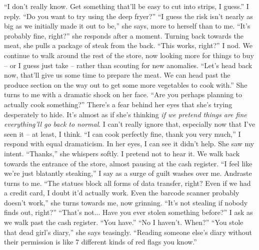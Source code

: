 \documentclass[a4paper, 12pt]{book}
\newcommand\tab[1][1cm]{\hspace*{#1}}
\begin{document}
\tab
``I don’t really know. Get something that’ll be easy to cut into strips, I guess.'' I reply. ``Do you want to try using the deep fryer?''
\newline
\tab
``I guess the risk isn’t nearly as big as we initially made it out to be,'' she says, more to herself than to me. ``It’s probably fine, right?'' she responds after a moment. Turning back towards the meat, she pulls a package of steak from the back. ``This works, right?'' I nod. We continue to walk around the rest of the store, now looking more for things to buy -- or I guess just take -- rather than scouting for new anomalies.
\newline
\tab
``Let’s head back now, that’ll give us some time to prepare the meat. We can head past the produce section on the way out to get some more vegetables to cook with.'' 
\newline
\tab
She turns to me with a dramatic shock on her face. ``Are you perhaps planning to actually cook something?''
\newline
\tab
There’s a fear behind her eyes that she’s trying desperately to hide. It’s almost as if she’s thinking \textit{if we pretend things are fine everything’ll go back to normal}. I can’t really ignore that, especially now that I’ve seen it -- at least, I think. ``I can cook perfectly fine, thank you very much,'' I respond with equal dramaticism. In her eyes, I can see it didn’t help. She saw my intent. 
\newline
\tab
``Thanks,'' she whispers softly. I pretend not to hear it.
\newline
\tab
We walk back towards the entrance of the store, almost pausing at the cash register. ``I feel like we’re just blatantly steaking,'' I say as a surge of guilt washes over me.
\newline
\tab
Andraste turns to me. ``The statues block all forms of data transfer, right? Even if we had a credit card, I doubt it’d actually work. Even the barcode scanner probably doesn’t work,'' she turns towards me, now grinning. ``It’s not stealing if nobody finds out, right?''
\newline
\tab
``That’s not... Have you ever stolen something before?'' I ask as we walk past the cash register.
\newline
\tab
``You have.''
\newline
\tab
``No I haven’t. When?''
\newline
\tab
``You stole that dead girl’s diary,'' she says teasingly. ``Reading someone else’s diary without their permission is like 7 different kinds of red flags you know.''
\end{document}
